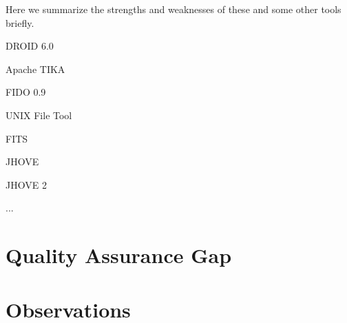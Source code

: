 Here we summarize the strengths and weaknesses of these and some other tools briefly.

DROID 6.0

Apache TIKA

FIDO 0.9 

UNIX File Tool

FITS

JHOVE

JHOVE 2

...



\section{Quality Assurance Gap}

\section{Observations}

